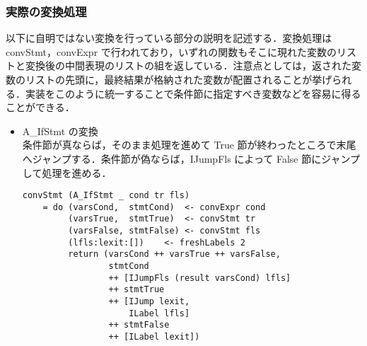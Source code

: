 \documentclass{jsarticle}
\begin{document}
\subsubsection{実際の変換処理}
以下に自明ではない変換を行っている部分の説明を記述する．変換処理は convStmt，convExpr で行われており，いずれの関数もそこに現れた変数のリストと変換後の中間表現のリストの組を返している．注意点としては，返された変数のリストの先頭に，最終結果が格納された変数が配置されることが挙げられる．実装をこのように統一することで条件節に指定すべき変数などを容易に得ることができる．
\begin{itemize}
\item A\_IfStmt の変換 \mbox{} \\
条件節が真ならば，そのまま処理を進めて True 節が終わったところで末尾へジャンプする．条件節が偽ならば，IJumpFls によって False 節にジャンプして処理を進める．
\begin{verbatim}
convStmt (A_IfStmt _ cond tr fls)
    = do (varsCond,  stmtCond)  <- convExpr cond
         (varsTrue,  stmtTrue)  <- convStmt tr
         (varsFalse, stmtFalse) <- convStmt fls
         (lfls:lexit:[])    <- freshLabels 2
         return (varsCond ++ varsTrue ++ varsFalse,
                 stmtCond
                 ++ [IJumpFls (result varsCond) lfls]
                 ++ stmtTrue
                 ++ [IJump lexit,
                     ILabel lfls]
                 ++ stmtFalse
                 ++ [ILabel lexit])
\end{verbatim}


\end{itemize}
\end{document}

